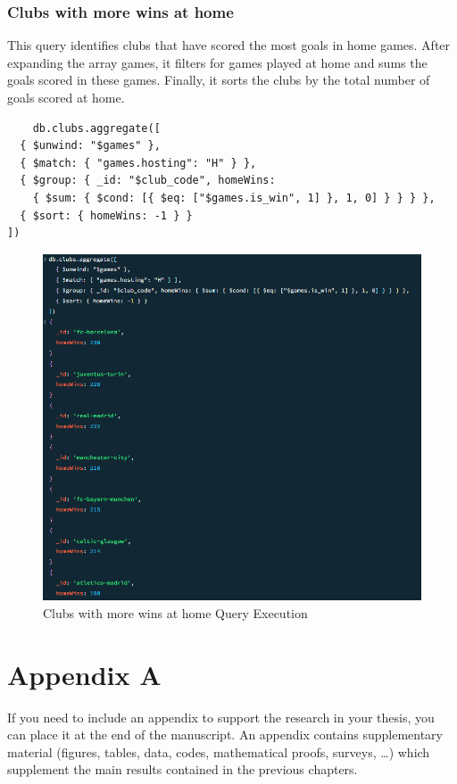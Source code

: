 \documentclass{Configuration_Files/PoliMi3i_thesis}
\begin{document}
\subsection{Clubs with more wins at home}
This query identifies clubs that have scored the most goals in home games. After expanding the array games, it filters for games played at home and sums the goals scored in these games. Finally, it sorts the clubs by the total number of goals scored at home.
\begin{verbatim}
    db.clubs.aggregate([
  { $unwind: "$games" },
  { $match: { "games.hosting": "H" } },
  { $group: { _id: "$club_code", homeWins: 
    { $sum: { $cond: [{ $eq: ["$games.is_win", 1] }, 1, 0] } } } },
  { $sort: { homeWins: -1 } }
])
\end{verbatim}
\begin{figure}[htbp]
    \centering
    \includegraphics[scale=0.8]{Images/Queries/Clubs/more_wins_at_home/mwat.png}
    \caption{Clubs with more wins at home Query Execution}
\end{figure}


\cleardoublepage
{} %
\appendix
\chapter{Appendix A}
If you need to include an appendix to support the research in your thesis, you can place it at the end of the manuscript.
An appendix contains supplementary material (figures, tables, data, codes, mathematical proofs, surveys, \dots)
which supplement the main results contained in the previous chapters.


\listoffigures

\listoftables

\cleardoublepage
\end{document}
